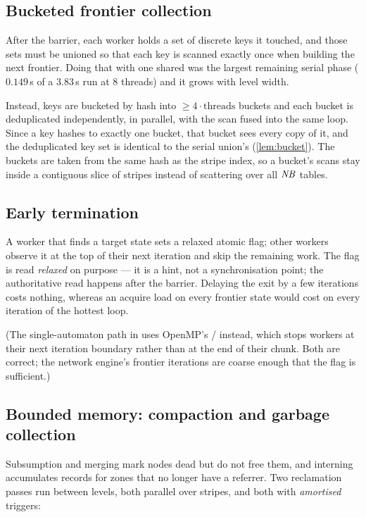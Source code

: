 \subsection{Bucketed frontier collection}

After the barrier, each worker holds a set of discrete keys it touched, and
those sets must be unioned so that each key is scanned exactly once when
building the next frontier.  Doing that with one shared 
was the largest remaining serial phase ($0.149$\,s of a $3.83$\,s
 run at $8$ threads) and it grows with level width.

Instead, keys are bucketed by hash into $\ge 4 \cdot \text{threads}$ buckets and
each bucket is deduplicated independently, in parallel, with the
 scan fused into the same loop.  Since a key hashes to exactly
one bucket, that bucket sees every copy of it, and the deduplicated key set is
identical to the serial union's (\cref{lem:bucket}).  The buckets are taken
from the same hash as the stripe index, so a bucket's scans stay inside a
contiguous slice of stripes instead of scattering over all $\mathit{NB}$ tables.

\subsection{Early termination}

A worker that finds a target state sets a relaxed atomic flag; other workers
observe it at the top of their next iteration and skip the remaining work.  The
flag is read \emph{relaxed} on purpose --- it is a hint, not a synchronisation
point; the authoritative read happens after the barrier.  Delaying the exit by
a few iterations costs nothing, whereas an acquire load on every frontier state
would cost on every iteration of the hottest loop.

(The single-automaton path in  uses OpenMP's
 /  instead, which stops workers
at their next iteration boundary rather than at the end of their chunk.  Both
are correct; the network engine's frontier iterations are coarse enough that
the flag is sufficient.)

\subsection{Bounded memory: compaction and garbage collection}

Subsumption and merging mark nodes dead but do not free them, and interning
accumulates records for zones that no longer have a referrer.  Two reclamation
passes run between levels, both parallel over stripes, and both with
\emph{amortised} triggers:

